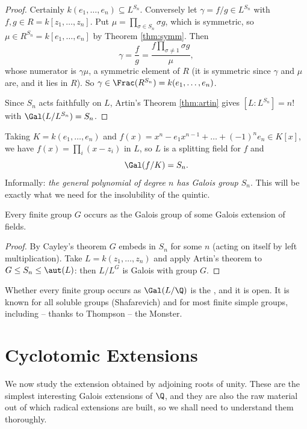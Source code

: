 \begin{proof}
	Certainly $k(e_1,\dots,e_n)\subseteq L^{S_n}$. Conversely let $\gamma = f/g \in L^{S_n}$ with $f, g \in R = k[z_1,\dots,z_n]$. Put $\mu = \prod_{\sigma\in S_n}\sigma g$, which is symmetric, so $\mu \in R^{S_n} = k[e_1,\dots,e_n]$ by Theorem \ref{thm:symm}. Then
	$$\gamma = \frac{f}{g} = \frac{f \prod_{\sigma\neq 1}\sigma g}{\mu},$$
	whose numerator is $\gamma\mu$, a symmetric element of $R$ (it is symmetric since $\gamma$ and $\mu$ are, and it lies in $R$). So $\gamma \in \Frac(R^{S_n}) = k(e_1,\dots,e_n)$.

	Since $S_n$ acts faithfully on $L$, Artin's Theorem \ref{thm:artin} gives $[L:L^{S_n}] = n!$ with $\Gal(L/L^{S_n}) = S_n$.
\end{proof}

Taking $K = k(e_1,\dots,e_n)$ and $f(x) = x^n - e_1x^{n-1}+\dots+(-1)^ne_n \in K[x]$, we have $f(x) = \prod_i (x - z_i)$ in $L$, so $L$ is a splitting field for $f$ and
$$\Gal(f/K) = S_n.$$
Informally: \emph{the general polynomial of degree $n$ has Galois group $S_n$}. This will be exactly what we need for the insolubility of the quintic.

\begin{corollary}
	Every finite group $G$ occurs as the Galois group of some Galois extension of fields.
\end{corollary}

\begin{proof}
	By Cayley's theorem $G$ embeds in $S_n$ for some $n$ (acting on itself by left multiplication). Take $L = k(z_1,\dots,z_n)$ and apply Artin's theorem to $G \leq S_n \leq \aut(L)$: then $L/L^G$ is Galois with group $G$.
\end{proof}

Whether every finite group occurs as $\Gal(L/\Q)$ is the , and it is open. It is known for all soluble groups (Shafarevich) and for most finite simple groups, including -- thanks to Thompson -- the Monster.

\section{Cyclotomic Extensions}\label{sec:cyclotomic}

We now study the extension obtained by adjoining roots of unity. These are the simplest interesting Galois extensions of $\Q$, and they are also the raw material out of which radical extensions are built, so we shall need to understand them thoroughly.

